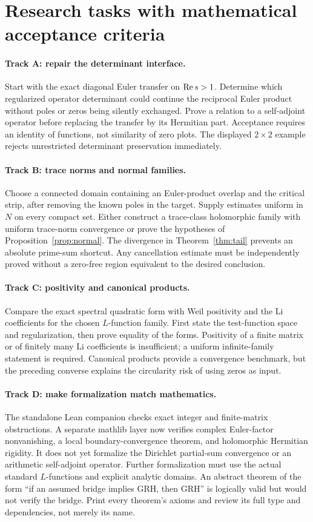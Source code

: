\section{Research tasks with mathematical acceptance criteria}
\paragraph{Track A: repair the determinant interface.}
Start with the exact diagonal Euler transfer on $\operatorname{Re} s>1$.
Determine which regularized operator determinant could continue the
reciprocal Euler product without poles or zeros being silently exchanged.
Prove a relation to a self-adjoint operator before replacing the transfer
by its Hermitian part. Acceptance requires an identity of functions,
not similarity of zero plots. The displayed $2\times2$ example rejects
unrestricted determinant preservation immediately.

\paragraph{Track B: trace norms and normal families.}
Choose a connected domain containing an Euler-product overlap and the
critical strip, after removing the known poles in the target. Supply
estimates uniform in $N$ on every compact set. Either construct a
trace-class holomorphic family with uniform trace-norm convergence or
prove the hypotheses of Proposition~\ref{prop:normal}. The divergence
in Theorem~\ref{thm:tail} prevents an absolute prime-sum shortcut.
Any cancellation estimate must be independently proved without a
zero-free region equivalent to the desired conclusion.

\paragraph{Track C: positivity and canonical products.}
Compare the exact spectral quadratic form with Weil positivity and the
Li coefficients for the chosen $L$-function family. First state the
test-function space and regularization, then prove equality of the
forms. Positivity of a finite matrix or of finitely many Li coefficients
is insufficient; a uniform infinite-family statement is required.
Canonical products provide a convergence benchmark, but the preceding
converse explains the circularity risk of using zeros as input.

\paragraph{Track D: make formalization match mathematics.}
The standalone Lean companion checks exact integer and finite-matrix
obstructions. A separate mathlib layer now verifies complex Euler-factor
nonvanishing, a local boundary-convergence theorem, and holomorphic
Hermitian rigidity. It does not yet formalize the Dirichlet partial-sum
convergence or an arithmetic self-adjoint operator. Further formalization
must use the actual standard $L$-functions and explicit analytic domains. An abstract theorem of the form
``if an assumed bridge implies GRH, then GRH'' is logically valid but
would not verify the bridge. Print every theorem's axioms and review
its full type and dependencies, not merely its name.


